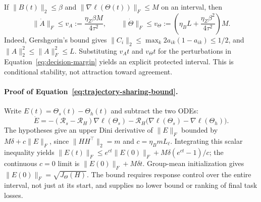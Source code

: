 If $\|B(t)\|_2\le\beta$ and $\|\nabla\ell(\Theta(t))\|_F\le M$
on an interval, then
\begin{equation}
 \|\dot A\|_F\le v_A:=\frac{\eta_Z\beta M}{4\tau^2},\qquad
 \|\dot\Theta\|_F\le v_\Theta:=
 \left(\eta_BL+\frac{\eta_Z\beta^2}{4\tau^2}\right)M.
 \label{eq:decision-speed-bounds}
\end{equation}
Indeed, Gershgorin's bound gives
$\|C_i\|_2\le\max_k2a_{ik}(1-a_{ik})\le1/2$, and
$\|A\|_2^2\le\|A\|_F^2\le L$.
Substituting $v_At$ and $v_\Theta t$ for the perturbations in
Equation~\eqref{eq:decision-margin} yields an explicit protected interval.
This is conditional stability, not attraction toward agreement.

\paragraph{Proof of Equation~\eqref{eq:trajectory-sharing-bound}.}
Write $E(t)=\Theta_s(t)-\Theta_h(t)$ and subtract the two ODEs:
\[
 \dot E=-(\mathcal R_s-\mathcal R_H)\nabla\ell(\Theta_s)
         -\mathcal R_H\bigl(\nabla\ell(\Theta_s)-\nabla\ell(\Theta_h)\bigr).
\]
The hypotheses give an upper Dini derivative of $\|E\|_F$ bounded by
$M\delta+c\|E\|_F$, since $\|HH^\top\|_2=m$ and
$c=\eta_BmL_\ell$. Integrating this scalar inequality yields
$\|E(t)\|_F\le e^{ct}\|E(0)\|_F+M\delta(e^{ct}-1)/c$;
the continuous $c=0$ limit is $\|E(0)\|_F+M\delta t$.
Group-mean initialization gives $\|E(0)\|_F=\sqrt{J_\Theta(H)}$.
The bound requires response control over the entire interval, not just
at its start, and supplies no lower bound or ranking of final task losses.

